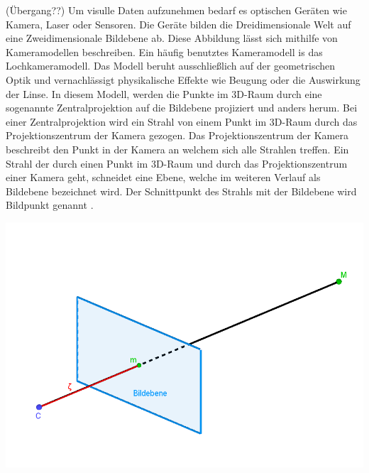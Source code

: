 (Übergang??)
Um visulle Daten aufzunehmen bedarf es optischen Geräten wie Kamera, Laser oder Sensoren. Die Geräte bilden die Dreidimensionale Welt auf eine Zweidimensionale Bildebene ab. Diese Abbildung lässt sich mithilfe von Kameramodellen beschreiben. Ein häufig benutztes Kameramodell is das Lochkameramodell. 
Das Modell beruht ausschließlich auf der geometrischen Optik und vernachlässigt physikalische Effekte wie Beugung oder die Auswirkung der Linse\cite{Heipke}. In diesem Modell, werden die Punkte im 3D-Raum durch eine sogenannte Zentralprojektion auf die Bildebene projiziert und anders herum\cite{CamerModels.,HZ}. 
%
%
Bei einer Zentralprojektion wird ein Strahl von einem Punkt im 3D-Raum durch das Projektionszentrum der Kamera gezogen. Das Projektionszentrum der Kamera beschreibt den Punkt in der Kamera an welchem sich alle Strahlen treffen. Ein Strahl der durch einen Punkt im 3D-Raum und durch das Projektionszentrum einer Kamera geht, schneidet eine Ebene, welche im weiteren Verlauf als Bildebene bezeichnet wird. Der Schnittpunkt des Strahls mit der Bildebene wird Bildpunkt genannt \cite{CamerModels.,HZ}.\\

	\begin{minipage}{\linewidth}
	\centering
	\includegraphics[width=.8\linewidth]{images/Zentralprojektion.png}
	\label{fig:Zentralprojektion}
\end{minipage}\\ \\

